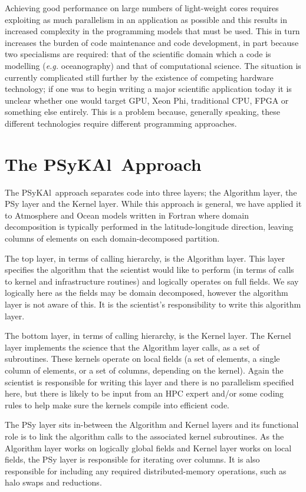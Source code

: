 \documentclass{IOS-Book-Article}
\newcommand{\psykal}{{PS}y{KA}l\ }
\begin{document}
Achieving good performance on large numbers of light-weight cores
requires exploiting as much parallelism in an application as possible
and this results in increased complexity in the programming models
that must be used. This in turn increases the burden of code
maintenance and code development, in part because two specialisms are
required: that of the scientific domain which a code is modelling
({\it e.g.} oceanography) and that of computational science. The
situation is currently complicated still further by the existence of
competing hardware technology; if one was to begin writing a major
scientific application today it is unclear whether one would target
GPU, Xeon Phi, traditional CPU, FPGA or something else entirely. This
is a problem because, generally speaking, these different technologies
require different programming approaches.

\section{The \psykal Approach}

The \psykal approach separates code into three layers; the Algorithm
layer, the PSy layer and the Kernel layer. While this approach is
general, we have applied it to Atmosphere and Ocean models written in
Fortran where domain decomposition is typically performed in the
latitude-longitude direction, leaving columns of elements on each
domain-decomposed partition.

The top layer, in terms of calling hierarchy, is the Algorithm
layer. This layer specifies the algorithm that the scientist would like
to perform (in terms of calls to kernel and infrastructure routines)
and logically operates on full fields. We say logically here as the
fields may be domain decomposed, however the algorithm layer is not
aware of this. It is the scientist's responsibility to write this
algorithm layer.

The bottom layer, in terms of calling hierarchy, is the Kernel
layer. The Kernel layer implements the science that the Algorithm
layer calls, as a set of subroutines. These kernels operate on local
fields (a set of elements, a single column of elements, or a set of
columns, depending on the kernel). Again the scientist is responsible
for writing this layer and there is no parallelism specified here, but
there is likely to be input from an HPC expert and/or some coding
rules to help make sure the kernels compile into efficient code.

The PSy layer sits in-between the Algorithm and Kernel layers and its
functional role is to link the algorithm calls to the associated
kernel subroutines. As the Algorithm layer works on logically global
fields and Kernel layer works on local fields, the PSy layer is
responsible for iterating over columns. It is also responsible for
including any required distributed-memory operations, such as halo
swaps and reductions.
\end{document}
